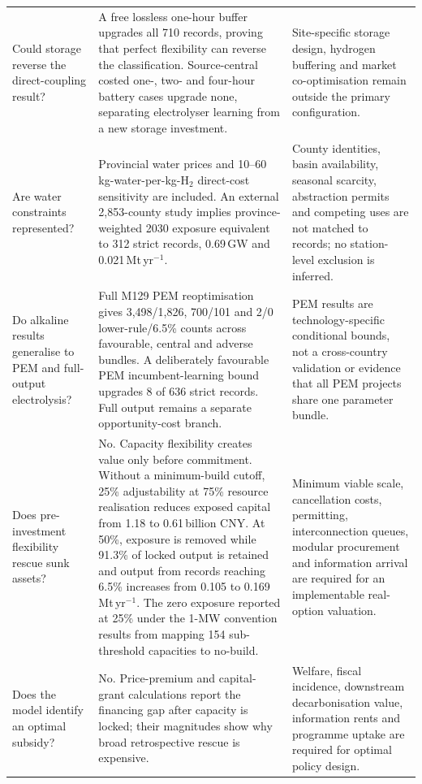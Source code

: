 \documentclass[11pt,a4paper]{article}
\begin{document}
\begin{longtable}{>{\raggedright\arraybackslash}p{}>{\raggedright\arraybackslash}p{}>{\raggedright\arraybackslash}p{}}
Could storage reverse the direct-coupling result? & A free lossless one-hour buffer upgrades all 710 records, proving that perfect flexibility can reverse the classification. Source-central costed one-, two- and four-hour battery cases upgrade none, separating electrolyser learning from a new storage investment. & Site-specific storage design, hydrogen buffering and market co-optimisation remain outside the primary configuration. \\
Are water constraints represented? & Provincial water prices and 10--60\,kg-water-per-kg-H$_2$ direct-cost sensitivity are included. An external 2,853-county study implies province-weighted 2030 exposure equivalent to 312 strict records, 0.69\,GW and 0.021\,Mt\,yr$^{-1}$. & County identities, basin availability, seasonal scarcity, abstraction permits and competing uses are not matched to records; no station-level exclusion is inferred. \\
Do alkaline results generalise to PEM and full-output electrolysis? & Full M129 PEM reoptimisation gives 3,498/1,826, 700/101 and 2/0 lower-rule/6.5\% counts across favourable, central and adverse bundles. A deliberately favourable PEM incumbent-learning bound upgrades 8 of 636 strict records. Full output remains a separate opportunity-cost branch. & PEM results are technology-specific conditional bounds, not a cross-country validation or evidence that all PEM projects share one parameter bundle. \\
Does pre-investment flexibility rescue sunk assets? & No. Capacity flexibility creates value only before commitment. Without a minimum-build cutoff, 25\% adjustability at 75\% resource realisation reduces exposed capital from 1.18 to 0.61\,billion CNY. At 50\%, exposure is removed while 91.3\% of locked output is retained and output from records reaching 6.5\% increases from 0.105 to 0.169\,Mt\,yr$^{-1}$. The zero exposure reported at 25\% under the 1-MW convention results from mapping 154 sub-threshold capacities to no-build. & Minimum viable scale, cancellation costs, permitting, interconnection queues, modular procurement and information arrival are required for an implementable real-option valuation. \\
Does the model identify an optimal subsidy? & No. Price-premium and capital-grant calculations report the financing gap after capacity is locked; their magnitudes show why broad retrospective rescue is expensive. & Welfare, fiscal incidence, downstream decarbonisation value, information rents and programme uptake are required for optimal policy design. \\
\end{longtable}
\endgroup
\FloatBarrier
\end{document}
